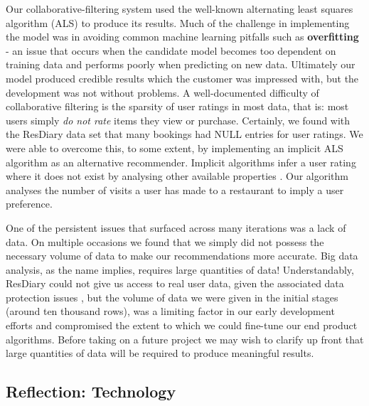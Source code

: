 \documentclass{l3proj}
\begin{document}
Our collaborative-filtering system used the well-known alternating least squares algorithm (ALS) \cite{ALS} to produce its results. Much of the challenge in implementing the model was in avoiding common machine learning pitfalls such as \textbf{overfitting} - an issue that occurs when the candidate model becomes too dependent on training data and performs poorly when predicting on new data. Ultimately our model produced credible results which the customer was impressed with, but the development was not without problems. A well-documented \cite{CollabFilter} difficulty of collaborative filtering is the sparsity of user ratings in most data, that is: most users simply \textit{do not rate} items they view or purchase. Certainly, we found with the ResDiary data set that many bookings had NULL entries for user ratings. We were able to overcome this, to some extent, by implementing an implicit ALS algorithm as an alternative recommender. Implicit algorithms infer a user rating where it does not exist by analysing other available properties \cite{ImplicitALS}. Our algorithm analyses the number of visits a user has made to a restaurant to imply a user preference.

One of the persistent issues that surfaced across many iterations was a lack of data. On multiple occasions we found that we simply did not possess the necessary volume of data to make our recommendations more accurate. Big data analysis, as the name implies, requires large quantities of data! Understandably, ResDiary could not give us access to real user data, given the associated data protection issues \cite{DataProtection}, but the volume of data we were given in the initial stages (around ten thousand rows), was a limiting factor in our early development efforts and compromised the extent to which we could fine-tune our end product algorithms. Before taking on a future project we may wish to clarify up front that large quantities of data will be required to produce meaningful results.

\subsection{Reflection: Technology}
\label{sec:pyreflection}

\end{document}
